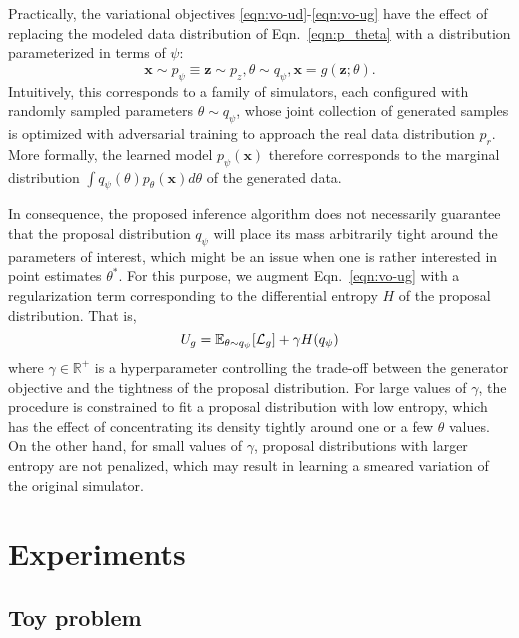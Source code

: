\documentclass[twocolumn,superscriptaddress,aps]{revtex4-1}
\theoremstyle{plain}
\begin{document}
Practically, the variational objectives \ref{eqn:vo-ud}-\ref{eqn:vo-ug}
have the effect of replacing the modeled data distribution of Eqn.~\ref{eqn:p_theta} with
a distribution parameterized in terms of $\psi$:
\begin{equation}\label{eqn:p_psi}
    \mathbf{x} \sim p_\psi \equiv \mathbf{z} \sim p_z, \theta \sim q_\psi, \mathbf{x} = g(\mathbf{z}; \theta).
\end{equation}
Intuitively, this corresponds to a family of simulators, each configured
with randomly sampled parameters $\theta \sim q_\psi$, whose joint collection
of generated samples is optimized with adversarial training to approach the real data distribution $p_r$.
More formally, the learned model $p_\psi(\mathbf{x})$ therefore corresponds to the marginal distribution
$\int q_\psi(\theta) p_\theta(\mathbf{x}) d\theta$ of the generated data.

In consequence, the proposed inference algorithm does not necessarily guarantee that the
proposal distribution $q_\psi$ will place its mass arbitrarily tight
around the parameters of interest, which might be an issue when one is rather interested in point estimates $\theta^*$.
For this purpose, we augment Eqn.~\ref{eqn:vo-ug}
with a regularization term corresponding to the differential entropy $H$ of
the proposal distribution. That is,
\begin{equation}
    U_g = \mathbb{E}_{\theta \sim q_\psi} [ {\cal L}_g ] + \gamma H(q_\psi)
\end{equation}
where $\gamma \in \mathbb{R}^+$ is a hyperparameter controlling the trade-off
between the generator objective and the tightness of the proposal distribution.
For large values of $\gamma$, the procedure is constrained to fit a proposal
distribution with low entropy, which has the effect of concentrating its density
tightly around one or a few $\theta$ values. On the other hand, for small values of $\gamma$,
proposal distributions with larger entropy are not penalized, which may result
in learning a smeared variation of the original simulator.






\section{Experiments}

\subsection{Toy problem}
\end{document}
